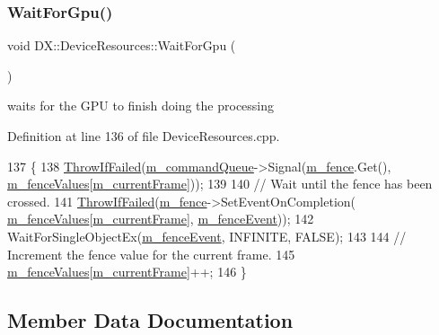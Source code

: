 \subsubsection{\texorpdfstring{Wait\+For\+Gpu()}{WaitForGpu()}}
{\footnotesize\ttfamily void D\+X\+::\+Device\+Resources\+::\+Wait\+For\+Gpu (\begin{DoxyParamCaption}{ }\end{DoxyParamCaption})}



waits for the G\+PU to finish doing the processing 



Definition at line 136 of file Device\+Resources.\+cpp.


\begin{DoxyCode}
137 \{
138     \mbox{\hyperlink{_direct_x_helper_8h_abca3eeca6b5772a1112e0a9a9e3d9013}{ThrowIfFailed}}(\mbox{\hyperlink{class_d_x_1_1_device_resources_a0f0882523aa09b109f3a7bc05ff01f46}{m\_commandQueue}}->Signal(\mbox{\hyperlink{class_d_x_1_1_device_resources_a147e6a63f6a733dc64c766c472d29d20}{m\_fence}}.Get(), 
      \mbox{\hyperlink{class_d_x_1_1_device_resources_a393281583e4e020d7a2d05c060c588a8}{m\_fenceValues}}[\mbox{\hyperlink{class_d_x_1_1_device_resources_ac5373e60722eaa25c1068aa754b501fa}{m\_currentFrame}}]));
139 
140     \textcolor{comment}{// Wait until the fence has been crossed.}
141     \mbox{\hyperlink{_direct_x_helper_8h_abca3eeca6b5772a1112e0a9a9e3d9013}{ThrowIfFailed}}(\mbox{\hyperlink{class_d_x_1_1_device_resources_a147e6a63f6a733dc64c766c472d29d20}{m\_fence}}->SetEventOnCompletion(
      \mbox{\hyperlink{class_d_x_1_1_device_resources_a393281583e4e020d7a2d05c060c588a8}{m\_fenceValues}}[\mbox{\hyperlink{class_d_x_1_1_device_resources_ac5373e60722eaa25c1068aa754b501fa}{m\_currentFrame}}], \mbox{\hyperlink{class_d_x_1_1_device_resources_af3ecc18e8cf542dbcbd33872605e1b62}{m\_fenceEvent}}));
142     WaitForSingleObjectEx(\mbox{\hyperlink{class_d_x_1_1_device_resources_af3ecc18e8cf542dbcbd33872605e1b62}{m\_fenceEvent}}, INFINITE, FALSE);
143 
144     \textcolor{comment}{// Increment the fence value for the current frame.}
145     \mbox{\hyperlink{class_d_x_1_1_device_resources_a393281583e4e020d7a2d05c060c588a8}{m\_fenceValues}}[\mbox{\hyperlink{class_d_x_1_1_device_resources_ac5373e60722eaa25c1068aa754b501fa}{m\_currentFrame}}]++;
146 \}
\end{DoxyCode}


\subsection{Member Data Documentation}
\mbox{\label{class_d_x_1_1_device_resources_a9f23666e062bdebe694eb2dd7e454cba}} 
